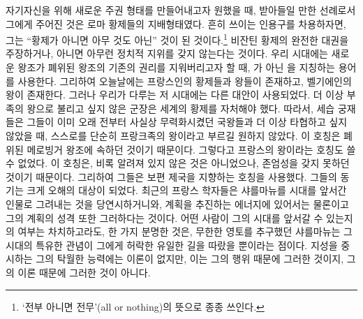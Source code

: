 자기자신을 위해 새로운 주권 형태를 만들어내고자 원했을 때,
받아들일 만한 선례로서 그에게 주어진 것은 로마 황제들의 지배형태였다.
흔히 쓰이는 인용구를 차용하자면, 그는
``황제가 아니면 아무 것도 아닌'' 것이
된 것이다.\footnote{`전부 아니면 전무'(all or nothing)의 뜻으로 종종 쓰인다.}
비잔틴 황제의 완전한 대권을 주장하거나, 아니면 아무런 정치적 지위를
갖지 않는다는 것이다.
우리 시대에는 새로운 왕조가 폐위된 왕조의 기존의 권리를 지워버리고자 할 때,
가 아닌 을 지칭하는 용어를 사용한다.
그리하여 오늘날에는 프랑스인의 황제들과 왕들이 존재하고,
벨기에인의 왕이 존재한다.
그러나 우리가 다루는 저 시대에는 다른 대안이 사용되었다.
더 이상 부족의 왕으로 불리고 싶지 않은 군장은 세계의 황제를 자처해야 했다.
따라서, 세습 궁재들은 그들이 이미 오래 전부터 사실상
무력화시켰던 국왕들과 더 이상 타협하고 싶지 않았을 때,
스스로를 단순히 프랑크족의 왕이라고 부르길 원하지 않았다.
이 호칭은 폐위된 메로빙거 왕조에 속하던 것이기 때문이다.
그렇다고 프랑스의 왕이라는 호칭도 쓸 수 없었다.
이 호칭은,
비록 알려져 있지 않은 것은 아니었으나, 존엄성을 갖지 못하던 것이기 때문이다.
그리하여 그들은 보편 제국을 지향하는 호칭을 사용했다.
그들의 동기는 크게 오해의 대상이 되었다.
최근의 프랑스 학자들은 샤를마뉴를 시대를 앞서간 인물로 그려내는 것을
당연시하거니와,
계획을 추진하는 에너지에 있어서는 물론이고
그의 계획의 성격 또한 그러하다는 것이다.
어떤 사람이 그의 시대를 앞서갈 수 있는지의 여부는 차치하고라도,
한 가지 분명한 것은, 무한한 영토를 추구했던 샤를마뉴는
그 시대의 특유한 관념이 그에게 허락한 유일한 길을 따랐을 뿐이라는 점이다.
지성을 중시하는 그의 탁월한 능력에는 이론이 없지만,
이는 그의 행위 때문에 그러한 것이지, 그의 이론 때문에 그러한 것이 아니다.

